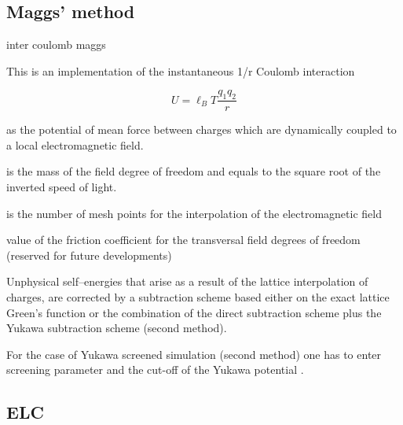 \subsection{Maggs' method}

\begin{essyntax}
  inter coulomb
  maggs   
\end{essyntax}

This is an implementation of the instantaneous 1/r Coulomb interaction

\[ U = \ell_B T \frac{q_1 q_2}{r} \]

as the potential of mean force between charges which are dynamically
coupled to a local electromagnetic field.

 is the mass of the field degree of freedom and equals to
the square root of the inverted speed of light.

 is the number of mesh points for the interpolation of the
electromagnetic field

 value of the friction coefficient for the
transversal field degrees of freedom (reserved for future
developments)

Unphysical self--energies that arise as a result of the lattice
interpolation of charges, are corrected by a subtraction scheme based
either on the exact lattice Green's function or the combination of the
direct subtraction scheme plus the Yukawa subtraction scheme (second
method).

For the case of Yukawa screened simulation (second method) one has to
enter screening parameter  and the cut-off of the Yukawa
potential .

\subsection{ELC}

